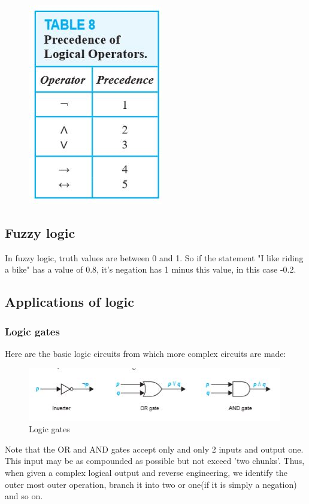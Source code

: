 \documentclass{article}
\theoremstyle{definition}
\numberwithin{equation}{subsection}
\numberwithin{remark}{subsection}
\begin{document}
\begin{figure}[h]
    \centering
    \includegraphics{figures/precedence}
\end{figure}

\subsection{Fuzzy logic}

In fuzzy logic, truth values are between 0 and 1. So if the statement "I like riding a bike" has a value of 0.8, it's negation has 1 minus this value, in this case -0.2. 

\subsection{Applications of logic}
\subsubsection{Logic gates}
Here are the basic logic circuits from which more complex circuits are made: 

\begin{figure}[h]
    \centering
    \includegraphics[scale= 1]{epflSemesterOne/advancedComputation/figures/logicgates.JPG}
    \caption{Logic gates}
    \label{fig:my_label}
\end{figure}

Note that the OR and AND gates accept only and only 2 inputs and output one. This input may be as compounded as possible but not exceed 'two chunks'. Thus, when given a complex logical output and reverse engineering, we identify the outer most outer operation, branch it into two or one(if it is simply a negation) and so on. 
\end{document}
